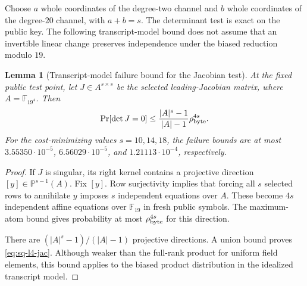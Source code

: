 \documentclass[11pt]{article}
\newtheorem{lemma}[theorem]{Lemma}
\newcommand{\F}{\mathbb F}
\begin{document}
Choose $a$ whole coordinates of the degree-two channel and $b$ whole
coordinates of the degree-$20$ channel, with $a+b=s$.  The determinant
test is exact on the public key.  The following transcript-model bound does
not assume that an invertible linear change preserves independence under the
biased reduction modulo $19$.

\begin{lemma}[Transcript-model failure bound for the Jacobian test]
\label{lem:sq-l4-projective-jacobian}
At the fixed public test point, let $J\in A^{s\times s}$ be the selected
leading-Jacobian matrix, where $A=\F_{19^4}$.  Then
\begin{equation}
 \Pr[\det J=0]
 \le \frac{|A|^s-1}{|A|-1}\rho_{\rm byte}^{4s}.      \label{eq:sq-l4-jac}
\end{equation}
For the cost-minimizing values $s=10,14,18$, the failure bounds are at most
$3.55350\cdot10^{-5}$, $6.56029\cdot10^{-5}$, and
$1.21113\cdot10^{-4}$, respectively.
\end{lemma}

\begin{proof}
If $J$ is singular, its right kernel contains a projective direction
$[y]\in\mathbb P^{s-1}(A)$.  Fix $[y]$.  Row surjectivity implies that forcing
all $s$ selected rows to annihilate $y$ imposes $s$ independent equations over
$A$.  These become $4s$ independent affine equations over $\F_{19}$ in fresh
public symbols.  The maximum-atom bound gives probability at most
$\rho_{\rm byte}^{4s}$ for this direction.

There are $(|A|^s-1)/(|A|-1)$ projective directions.  A union bound proves
\eqref{eq:sq-l4-jac}.  Although weaker than the full-rank product for uniform
field elements, this bound applies to the biased product distribution in the
idealized transcript model.
\end{proof}
\end{document}
